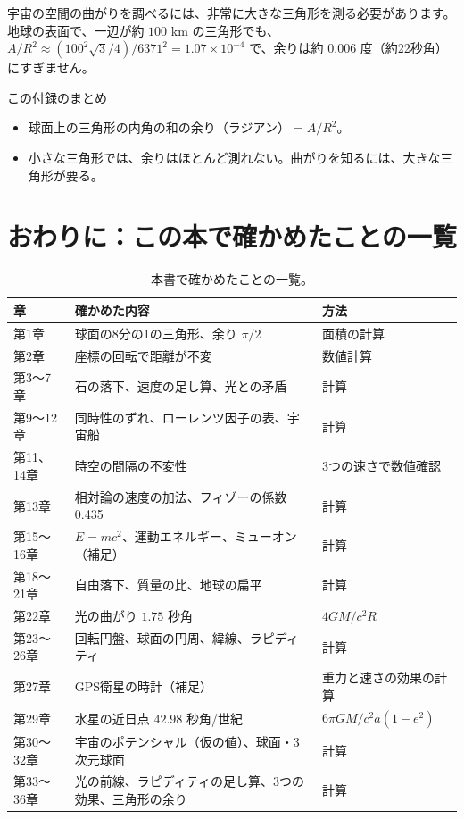 \documentclass[a4paper,11pt,openany]{ltjsbook}
\begin{document}
宇宙の空間の曲がりを調べるには、非常に大きな三角形を測る必要があります。地球の表面で、一辺が約 $100$ km の三角形でも、$A/R^2\approx(100^2\sqrt3/4)/6371^2=1.07\times10^{-4}$ で、余りは約 $0.006$ 度（約22秒角）にすぎません。

\begin{pointbox}{この付録のまとめ}
\begin{itemize}[leftmargin=*]
\item 球面上の三角形の内角の和の余り（ラジアン）$=A/R^2$。
\item 小さな三角形では、余りはほとんど測れない。曲がりを知るには、大きな三角形が要る。
\end{itemize}
\end{pointbox}

\chapter*{おわりに：この本で確かめたことの一覧}

\begin{table}[htbp]
\centering
\small
\begin{tabular}{lll}
\toprule
章 & 確かめた内容 & 方法\\
\midrule
第1章 & 球面の8分の1の三角形、余り $\pi/2$ & 面積の計算\\
第2章 & 座標の回転で距離が不変 & 数値計算\\
第3〜7章 & 石の落下、速度の足し算、光との矛盾 & 計算\\
第9〜12章 & 同時性のずれ、ローレンツ因子の表、宇宙船 & 計算\\
第11、14章 & 時空の間隔の不変性 & 3つの速さで数値確認\\
第13章 & 相対論の速度の加法、フィゾーの係数0.435 & 計算\\
第15〜16章 & $E=mc^2$、運動エネルギー、ミューオン（補足） & 計算\\
第18〜21章 & 自由落下、質量の比、地球の扁平 & 計算\\
第22章 & 光の曲がり $1.75$ 秒角 & $4GM/c^2R$\\
第23〜26章 & 回転円盤、球面の円周、緯線、ラピディティ & 計算\\
第27章 & GPS衛星の時計（補足） & 重力と速さの効果の計算\\
第29章 & 水星の近日点 $42.98$ 秒角/世紀 & $6\pi GM/c^2a(1-e^2)$\\
第30〜32章 & 宇宙のポテンシャル（仮の値）、球面・3次元球面 & 計算\\
第33〜36章 & 光の前線、ラピディティの足し算、3つの効果、三角形の余り & 計算\\
\bottomrule
\end{tabular}
\caption{本書で確かめたことの一覧。}
\end{table}
\end{document}
